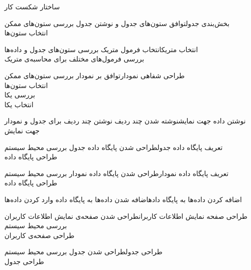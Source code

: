 \begin{wbsbox}{ساختار شکست کار}
\begin{wbssub}{بخش‌بندی جدول}{توافق ستون‌های جدول و نوشتن جدول}
\task بررسی ستون‌های ممکن \\
\task انتخاب ستون‌ها
\end{wbssub}

\begin{wbssub}{انتخاب متریک}{انتخاب فرمول متریک}
\task بررسی ستون‌های جدول و داده‌ها\\
\task بررسی فرمول‌های مختلف ‌برای محاسبه‌ی متریک
\end{wbssub}

\begin{wbssub}{طراحی شفاهی نمودار}{توافق بر نمودار}
\task بررسی ستون‌های ممکن \\
\task انتخاب ستون‌ها \\
\task بررسی یکا \\
\task انتخاب یکا
\end{wbssub}

\begin{wbssub}{نوشتن داده جهت نمایش}{نوشته شدن چند ردیف}
\task نوشتن چند ردیف برای جدول و نمودار جهت نمایش
\end{wbssub}

\begin{wbssub}{تعریف پایگاه داده جدول}{طراحی شدن پایگاه داده جدول}
\task بررسی محیط سیستم  \\
\task طراحی پایگاه داده
\end{wbssub}

\begin{wbssub}{تعریف پایگاه داده نمودار}{طراحی شدن پایگاه داده نمودار}
\task بررسی محیط سیستم  \\
\task طراحی پایگاه داده
\end{wbssub}

\begin{wbssub}{اضافه کردن داده‌ها به پایگاه داده}{اضافه شدن داده‌ها به پایگاه داده}
\task وارد کردن داده‌ها
\end{wbssub}

\begin{wbssub}{طراحی صفحه نمایش اطلاعات کاربران}{طراحی شدن صفحه‌ی نمایش اطلاعات کاربران}
\task بررسی محیط سیستم  \\
\task طراحی صفحه‌ی کاربران
\end{wbssub}

\begin{wbssub}{طراحی جدول}{طراحی شدن جدول}
\task بررسی محیط سیستم  \\
\task طراحی جدول
\end{wbssub}


\end{wbsbox}
